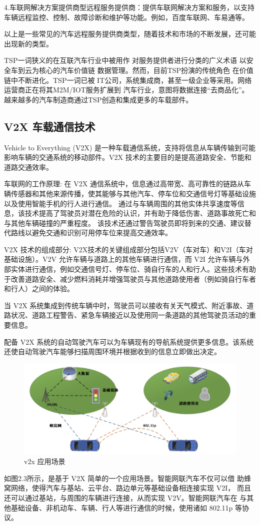   4.车联网解决方案提供商型远程服务提供商：提供车联网解决方案和服务，以支持车辆远程监控、控制、故障诊断和维护等功能。例如，百度车联网、车易通等。
  
  以上是一些常见的汽车远程服务提供商类型，随着技术和市场的不断发展，还可能出现新的类型。

TSP一词狭义的在互联汽车行业中被用作
对服务提供者进行分类的广义术语
以安全车到云为核心的汽车价值链
数据管理。然而，目前TSP扮演的传统角色
在价值链中不断进化。TSP一词已被
IT公司，系统集成商，甚至一级企业等采用。网络
运营商正在将其M2M/IOT服务扩展到
汽车行业，意图将数据连接“去商品化”。
越来越多的汽车制造商通过TSP创造和集成更多的车载部件。

\subsection{V2X 车载通信技术}

Vehicle to Everything (V2X) 是一种车载通信系统，支持将信息从车辆传输到可能影响车辆的交通系统的移动部件。V2X 技术的主要目的是提高道路安全、节能和道路交通效率。

车联网的工作原理: 在 V2X 通信系统中，信息通过高带宽、高可靠性的链路从车辆传感器和其他来源传播，使其能够与其他汽车、停车位和交通信号灯等基础设施以及使用智能手机的行人进行通信。
通过与车辆周围的其他实体共享速度等信息，该技术提高了驾驶员对潜在危险的认识，并有助于降低伤害、道路事故死亡和与其他车辆碰撞的严重程度。
该技术还通过警告驾驶员即将到来的交通、建议替代路线以避免交通和识别可用停车位来提高交通效率。

V2X 技术的组成部分:
V2X技术的关键组成部分包括V2V（车对车）和V2I（车对基础设施）。V2V 允许车辆与道路上的其他车辆进行通信，而 V2I 允许车辆与外部实体进行通信，例如交通信号灯、停车位、骑自行车的人和行人。这些技术有助于改善道路安全、减少燃料消耗并增强驾驶员与其他道路使用者（例如骑自行车者和行人）之间的体验。

当 V2X 系统集成到传统车辆中时，驾驶员可以接收有关天气模式、附近事故、道路状况、道路工程警告、紧急车辆接近以及使用同一条道路的其他驾驶员活动的重要信息。

配备 V2X 系统的自动驾驶汽车可以为车辆现有的导航系统提供更多信息。该系统还使自动驾驶汽车能够扫描周围环境并根据收到的信息立即做出决定。
\begin{figure}
    \centering
    \includegraphics[scale=0.6]{resources/img/i3.png}
    \caption{v2x 应用场景}
  \end{figure}
\newline
如图2.3所示，是基于 V2X 简单的一个应用场景。智能网联汽车不仅可以借
助蜂窝网络，使得汽车与基站、云平台、路边单元等基础设备相连接实现 V2I，
而且还可以通过基站，与周围的车辆进行连接，从而实现 V2V。智能网联汽车在
与其他基础设备、非机动车、车辆、行人等进行通信的时候，使用诸如 802.11p
等协议。

